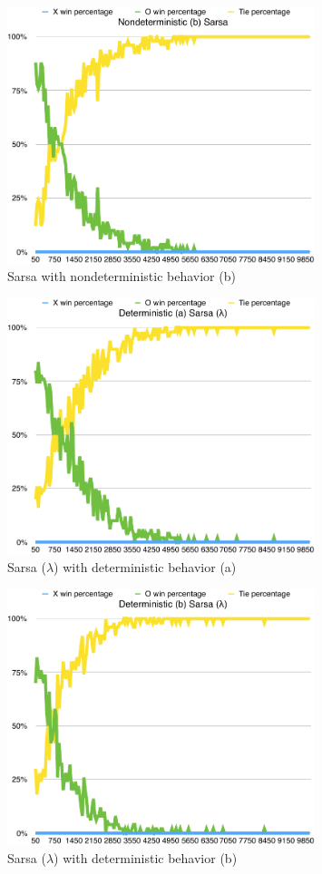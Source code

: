 \documentclass{journal}
\begin{document}
\begin{figure}[h]
	\includegraphics[width=0.8\textwidth]{SarsaN(b).pdf}
	\caption{Sarsa with nondeterministic behavior (b)}\label{fig:SNB}
\end{figure}
\begin{figure}[h]
	\includegraphics[width=0.8\textwidth]{SarsaLD(a).pdf}
	\caption{Sarsa ($\lambda{}$) with deterministic behavior (a)}\label{fig:SLDA}
\end{figure}
\begin{figure}[h]
	\includegraphics[width=0.8\textwidth]{SarsaLD(b).pdf}
	\caption{Sarsa ($\lambda{}$) with deterministic behavior (b)}\label{fig:SLDB}
\end{figure}
\end{document}
